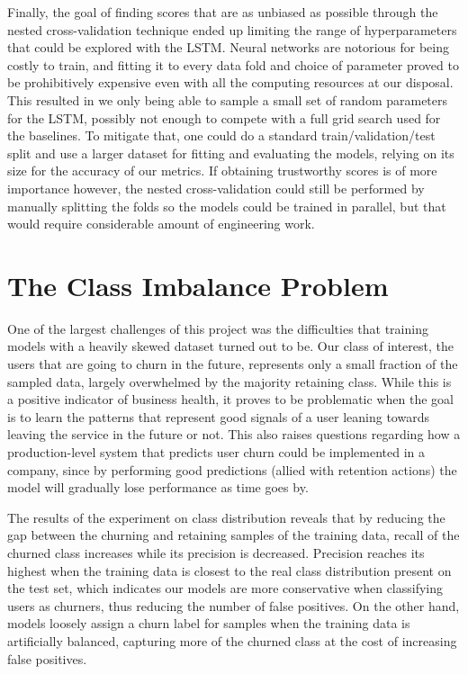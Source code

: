 \documentclass{kththesis}
\begin{document}
Finally, the goal of finding scores that are as unbiased as possible through the nested cross-validation technique ended up limiting the range of hyperparameters that could be explored with the LSTM. Neural networks are notorious for being costly to train, and fitting it to every data fold and choice of parameter proved to be prohibitively expensive even with all the computing resources at our disposal. This resulted in we only being able to sample a small set of random parameters for the LSTM, possibly not enough to compete with a full grid search used for the baselines. To mitigate that, one could do a standard train/validation/test split and use a larger dataset for fitting and evaluating the models, relying on its size for the accuracy of our metrics. If obtaining trustworthy scores is of more importance however, the nested cross-validation could still be performed by manually splitting the folds so the models could be trained in parallel, but that would require considerable amount of engineering work.


\section{The Class Imbalance Problem}
\label{sec:dis_class_dist}

One of the largest challenges of this project was the difficulties that training models with a heavily skewed dataset turned out to be. Our class of interest, the users that are going to churn in the future, represents only a small fraction of the sampled data, largely overwhelmed by the majority retaining class. While this is a positive indicator of business health, it proves to be problematic when the goal is to learn the patterns that represent good signals of a user leaning towards leaving the service in the future or not. This also raises questions regarding how a production-level system that predicts user churn could be implemented in a company, since by performing good predictions (allied with retention actions) the model will gradually lose performance as time goes by.

The results of the experiment on class distribution reveals that by reducing the gap between the churning and retaining samples of the training data, recall of the churned class increases while its precision is decreased. Precision reaches its highest when the training data is closest to the real class distribution present on the test set, which indicates our models are more conservative when classifying users as churners, thus reducing the number of false positives. On the other hand, models loosely assign a churn label for samples when the training data is artificially balanced, capturing more of the churned class at the cost of increasing false positives.
\end{document}
